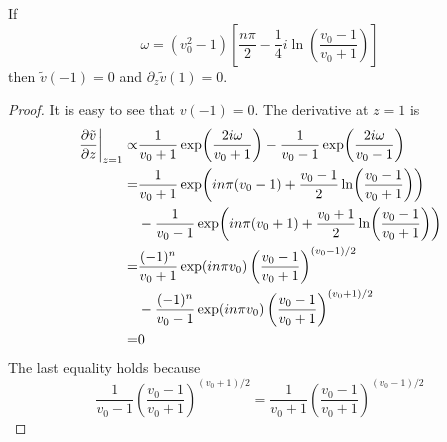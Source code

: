 \begin{theorem}
    If 
    \[\omega = (v_0^2-1) \left[ \frac{n\pi}{2} - \frac{1}{4}i\ln\left(\frac{v_0-1}{v_0+1}\right) \right]\]
    then $\tilde{v}(-1) = 0$ and $\partial_z\tilde{v}(1) = 0$.
\end{theorem}
\begin{proof}
    It is easy to see that $v(-1)=0$. The derivative at $z=1$ is
    \begin{align*}
        \eval{\pdv{\tilde{v}}{z}}_{z=1} \propto&
        \frac{1}{v_0+1}\exp(\frac{2i\omega}{v_0+1}) - \frac{1}{v_0-1}\exp(\frac{2i\omega}{v_0-1}) \\
        =& \frac{1}{v_0+1}\exp(in\pi(v_0-1) + \frac{v_0-1}{2}\ln(\frac{v_0-1}{v_0+1})) \\
        &- \frac{1}{v_0-1}\exp(in\pi(v_0+1) + \frac{v_0+1}{2}\ln(\frac{v_0-1}{v_0+1})) \\
        =& \frac{(-1)^n}{v_0+1}\exp(in\pi v_0)\left(\frac{v_0-1}{v_0+1}\right)^{(v_0-1)/2} \\
        &- \frac{(-1)^n}{v_0-1}\exp(in\pi v_0)\left(\frac{v_0-1}{v_0+1}\right)^{(v_0+1)/2} \\
        =& 0
    \end{align*}
    The last equality holds because 
    \[ \frac{1}{v_0-1}\left(\frac{v_0-1}{v_0+1}\right)^{(v_0+1)/2} 
    = \frac{1}{v_0+1}\left(\frac{v_0-1}{v_0+1}\right)^{(v_0-1)/2}  \]
\end{proof}